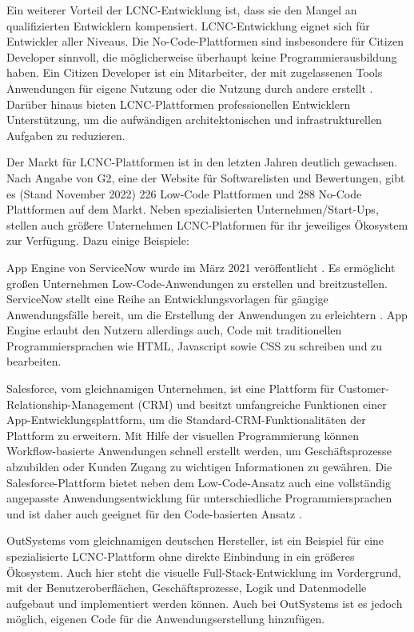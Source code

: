 Ein weiterer Vorteil der LCNC-Entwicklung ist, dass sie den Mangel an qualifizierten Entwicklern kompensiert. LCNC-Entwicklung eignet sich für Entwickler aller Niveaus. Die No-Code-Plattformen sind insbesondere für Citizen Developer sinnvoll, die möglicherweise überhaupt keine Programmierausbildung haben. Ein Citizen Developer ist ein Mitarbeiter, der mit zugelassenen Tools Anwendungen für eigene Nutzung oder die Nutzung durch andere erstellt \cite{lcnc:citidev}. Darüber hinaus bieten LCNC-Plattformen professionellen Entwicklern Unterstützung, um die aufwändigen architektonischen und infrastrukturellen Aufgaben zu reduzieren.

Der Markt für LCNC-Plattformen ist in den letzten Jahren deutlich gewachsen. Nach Angabe von G2, eine der Website für Softwarelisten und Bewertungen, gibt es (Stand November 2022) 226 Low-Code Plattformen \cite{lcnc:llcdpa} und 288 No-Code Plattformen \cite{lcnc:lncdpa} auf dem Markt. Neben spezialisierten Unternehmen/Start-Ups, stellen auch größere Unternehmen LCNC-Platformen für ihr jeweiliges Ökosystem zur Verfügung. Dazu einige Beispiele:

App Engine von ServiceNow wurde im März 2021 veröffentlicht \cite{lcnc:aesrn}. Es ermöglicht großen Unternehmen Low-Code-Anwendungen zu erstellen und breitzustellen. ServiceNow stellt eine Reihe an Entwicklungsvorlagen für gängige Anwendungsfälle bereit, um die Erstellung der Anwendungen zu erleichtern \cite{lcnc:snflc}. App Engine erlaubt den Nutzern allerdings auch, Code mit traditionellen Programmiersprachen wie HTML, Javascript sowie CSS zu schreiben und zu bearbeiten.

Salesforce, vom gleichnamigen Unternehmen, ist eine Plattform für Customer-Relationship-Management (CRM) und besitzt umfangreiche Funktionen einer App-Entwicklungsplattform, um die Standard-CRM-Funktionalitäten der Plattform zu erweitern. Mit Hilfe der visuellen Programmierung können Workflow-basierte Anwendungen schnell erstellt werden, um Geschäftsprozesse abzubilden oder Kunden Zugang zu wichtigen Informationen zu gewähren. Die Salesforce-Plattform bietet neben dem Low-Code-Ansatz auch eine vollständig angepasste Anwendungsentwicklung für unterschiedliche Programmiersprachen und ist daher auch geeignet für den Code-basierten Ansatz \cite{lcnc:sfpr}.

OutSystems vom gleichnamigen deutschen Hersteller, ist ein Beispiel für eine spezialisierte LCNC-Plattform ohne direkte Einbindung in ein größeres Ökosystem. Auch hier steht die visuelle Full-Stack-Entwicklung im Vordergrund, mit der Benutzeroberflächen, Geschäftsprozesse, Logik und Datenmodelle aufgebaut und implementiert werden können. Auch bei OutSystems ist es jedoch möglich, eigenen Code für die Anwendungserstellung hinzufügen.

